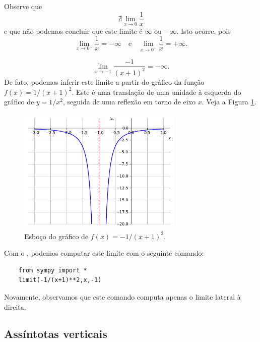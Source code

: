 \begin{ex}
  Observe que
  \begin{equation}
    \nexists \lim_{x\to 0} \frac{1}{x}
  \end{equation}
  e que não podemos concluir que este limite é $\infty$ ou $-\infty$. Isto ocorre, pois
  \begin{equation}
    \lim_{x\to 0^-} \frac{1}{x} = -\infty\quad\text{e}\quad\lim_{x\to 0^+} \frac{1}{x} = +\infty.
  \end{equation}
\end{ex}

\begin{ex}
  \begin{equation}
    \lim_{x\to -1} \frac{-1}{(x+1)^2} = -\infty.
  \end{equation}
  De fato, podemos inferir este limite a partir do gráfico da função $f(x) = 1/(x+1)^2$. Este é uma translação de uma unidade à esquerda do gráfico de $y = 1/x^2$, seguida de uma reflexão em torno de eixo $x$. Veja a Figura \ref{fig:ex_liminf-1x2}.

  \begin{figure}[H]
    \centering
    \includegraphics[width=0.7\textwidth]{./cap_lim/dados/fig_ex_liminf-1x2/fig_ex_liminf-1x2}
    \caption{Esboço do gráfico de $f(x)=-1/(x+1)^2$.}
    \label{fig:ex_liminf-1x2}
  \end{figure}

  \ifispython
  Com o {\sympy}, podemos computar este limite com o seguinte comando:
  \begin{lstlisting}
    from sympy import *
    limit(-1/(x+1)**2,x,-1)
  \end{lstlisting}
  Novamente, observamos que este comando computa apenas o limite lateral à direita.
  \fi
\end{ex}

\subsection{Assíntotas verticais}

